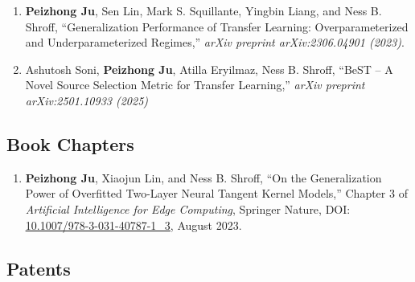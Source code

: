 \documentclass[10pt,letter]{article}
\begin{document}
\begin{small}
\begin{enumerate}

\item \textbf{Peizhong Ju}, Sen Lin, Mark S. Squillante, Yingbin Liang, and Ness B. Shroff, ``Generalization Performance of Transfer Learning: Overparameterized and Underparameterized Regimes,'' \textit{arXiv preprint arXiv:2306.04901 (2023)}.


\item Ashutosh Soni, \textbf{Peizhong Ju}, Atilla Eryilmaz, Ness B. Shroff, ``BeST -- A Novel Source Selection Metric for Transfer Learning,'' \textit{arXiv preprint 	arXiv:2501.10933 (2025)}





\end{enumerate}

\vspace{-0.4cm}
\subsection*{Book Chapters}

\begin{enumerate}[itemsep=0.6em]
    \item \textbf{Peizhong Ju}, Xiaojun Lin, and Ness B. Shroff, ``On the Generalization Power of Overfitted Two-Layer Neural Tangent Kernel Models,'' Chapter 3 of \emph{Artificial Intelligence for Edge Computing}, Springer Nature, DOI: \href{http://dx.doi.org/10.1007/978-3-031-40787-1\_3}{\underline{10.1007/978-3-031-40787-1\_3}}, August 2023.
\end{enumerate}


\vspace{-0.4cm}
\subsection*{Patents}


\end{small}
\end{document}
